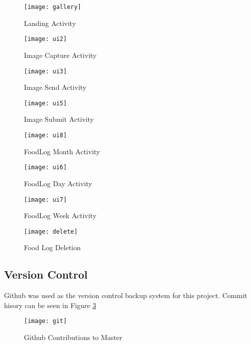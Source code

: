 \begin{figure} 
  \label{uiDesign1} 
  \begin{minipage}[b]{0.5\linewidth}
    \centering
    \texttt{[image: gallery]} 
    \caption{Landing Activity} 
  \label{fig:gallery}
    \vspace{4ex}
  \end{minipage}%
  \begin{minipage}[b]{0.5\linewidth}
    \centering
    \texttt{[image: ui2]} 
    \caption{Image Capture Activity} 
  \label{fig:ui2}
    \vspace{4ex}
  \end{minipage} 
  \begin{minipage}[b]{0.5\linewidth}
    \centering
    \texttt{[image: ui3]} 
    \caption{Image Send Activity} 
    \label{fig:ui3}
    \vspace{4ex}
  \end{minipage}%
  \begin{minipage}[b]{0.5\linewidth}
    \centering
    \texttt{[image: ui5]} 
    \caption{Image Submit Activity} 
    \label{fig:ui5}
    \vspace{4ex}
  \end{minipage} 
\end{figure}

\begin{figure}
  \label{uiDesign2} 
  \begin{minipage}[b]{0.5\linewidth}
    \centering
    \texttt{[image: ui8]} 
    \caption{FoodLog Month Activity} 
    \label{fig:ui8}
    \vspace{4ex}
  \end{minipage}
  \begin{minipage}[b]{0.5\linewidth}
    \centering
    \texttt{[image: ui6]} 
    \caption{FoodLog Day Activity} 
  \label{fig:ui6}
    \vspace{4ex}
  \end{minipage} 
  \begin{minipage}[b]{0.5\linewidth}
    \centering
    \texttt{[image: ui7]} 
    \caption{FoodLog Week Activity} 
    \label{fig:ui7}
    \vspace{4ex}
  \end{minipage}%
  \begin{minipage}[b]{0.5\linewidth}
    \centering
    \texttt{[image: delete]} 
    \caption{Food Log Deletion} 
  \label{fig:delete}
    \vspace{4ex} 
    \end{minipage}%
\end{figure}
\clearpage

\subsection*{Version Control}
Github was used as the version control backup system for this project.
Commit hisory can be seen in Figure \ref{fig:git}

\begin{figure}[h]
    \texttt{[image: git]}
    \caption{Github Contributions to Master}
    \label{fig:git}
\end{figure}






